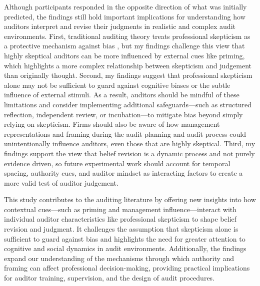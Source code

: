 \documentclass[12pt,english]{article}
\begin{document}
Although participants responded in the opposite direction of what was initially predicted, the findings still hold important implications for understanding how auditors interpret and revise their judgments in realistic and complex audit environments. First, traditional auditing theory treats professional skepticism as a protective mechanism against bias \citep{hurtt2008}, but my findings challenge this view that highly skeptical auditors can be more influenced by external cues like priming, which highlights a more complex relationship between skepticism and judgement than originally thought. Second, my findings suggest that professional skepticism alone may not be sufficient to guard against cognitive biases or the subtle influence of external stimuli. As a result, auditors should be mindful of these limitations and consider implementing additional safeguards—such as structured reflection, independent review, or incubation—to mitigate bias beyond simply relying on skepticism. Firms should also be aware of how management representations and framing during the audit planning and audit process could unintentionally influence auditors, even those that are highly skeptical. Third, my findings support the view that belief revision is a dynamic process and not purely evidence driven, so future experimental work should account for temporal spacing, authority cues, and auditor mindset as interacting factors to create a more valid test of auditor judgement. 

This study contributes to the auditing literature by offering new insights into how contextual cues—such as priming and management influence—interact with individual auditor characteristics like professional skepticism to shape belief revision and judgment. It challenges the assumption that skepticism alone is sufficient to guard against bias and highlights the need for greater attention to cognitive and social dynamics in audit environments. Additionally, the findings expand our understanding of the mechanisms through which authority and framing can affect professional decision-making, providing practical implications for auditor training, supervision, and the design of audit procedures.


   
  
\end{document}
